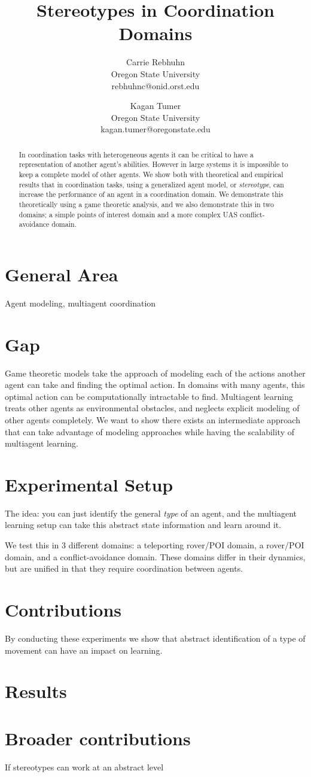 \documentclass{aamas2014}
\title{Stereotypes in Coordination Domains}
\author{Carrie Rebhuhn \\
Oregon State University \\
rebhuhnc@onid.orst.edu
 \and Kagan Tumer \\
 Oregon State University \\ 
 kagan.tumer@oregonstate.edu
 }
\begin{document}
\maketitle

\begin{abstract}
In coordination tasks with heterogeneous agents it can be critical to have a representation of another agent's abilities. However in large systems it is impossible to keep a complete model of other agents. We show both with theoretical and empirical results that in coordination tasks, using a generalized agent model, or \emph{stereotype}, can increase the performance of an agent in a coordination domain. We demonstrate this theoretically using a game theoretic analysis, and we also demonstrate this in two domains; a simple points of interest domain and a more complex UAS conflict-avoidance domain.
\end{abstract}

\section{General Area}

Agent modeling, multiagent coordination

\section{Gap}

Game theoretic models take the approach of modeling each of the actions another agent can take and finding the optimal action. In domains with many agents, this optimal action can be computationally intractable to find. Multiagent learning treats other agents as environmental obstacles, and neglects explicit modeling of other agents completely. We want to show there exists an intermediate approach that can take advantage of modeling approaches while having the scalability of multiagent learning.

\section{Experimental Setup}

The idea: you can just identify the general \emph{type} of an agent, and the multiagent learning setup can take this abstract state information and learn around it.

We test this in 3 different domains: a teleporting rover/POI domain, a rover/POI domain, and a conflict-avoidance domain. These domains differ in their dynamics, but are unified in that they require coordination between agents.

\section{Contributions}

By conducting these experiments we show that abstract identification of a type of movement can have an impact on learning. 


\section{Results}

\section{Broader contributions}

If stereotypes can work at an abstract level 
\end{document}
